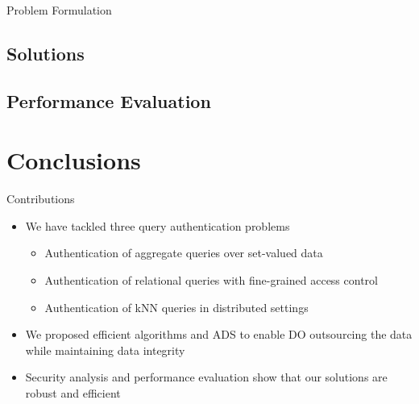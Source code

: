 \documentclass[xcolor={dvipsnames},aspectratio=169,10pt]{beamer}
\begin{document}
\begin{frame}{Problem Formulation}
\end{frame}

\subsection{Solutions}

\subsection{Performance Evaluation}

\section{Conclusions}

\begin{frame}{Contributions}
  \begin{itemize}
    \item We have tackled three query authentication problems
      \begin{itemize}
        \item Authentication of aggregate queries over set-valued data
        \item Authentication of relational queries with fine-grained access control
        \item Authentication of kNN queries in distributed settings
      \end{itemize}
    \item We proposed efficient algorithms and ADS to enable DO outsourcing the data while maintaining data integrity
    \item Security analysis and performance evaluation show that our solutions are robust and efficient
  \end{itemize}
\end{frame}
\end{document}
